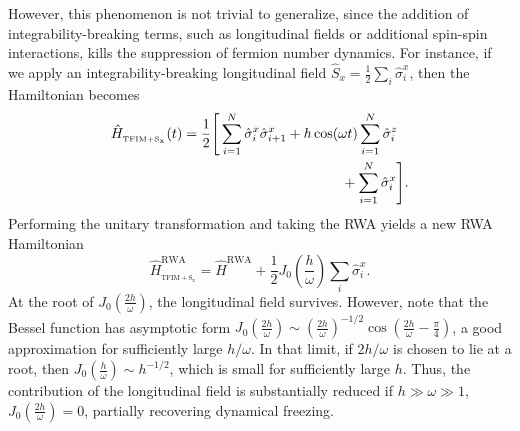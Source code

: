 \documentclass[%
reprint,
superscriptaddress,
amsmath,amssymb,
aps,
prb,
showkeys,
]{revtex4-2}
\begin{document}
However, this phenomenon is not trivial to generalize, since the addition of integrability-breaking terms, such as longitudinal fields or additional spin-spin interactions, kills the suppression of fermion number dynamics.  For instance, if we apply an integrability-breaking longitudinal field $\hat{S}_x = \frac12 \sum_i \hat{\sigma}^x_i$, then the Hamiltonian becomes 
\begin{align}
	\hat{H}_{_\mathrm{TFIM+S_{x}}}(t) &=\frac12 \Bigg[\sum^N_{i=1}  \hat{\sigma}_{i}^{x} \hat{\sigma}_{i+1}^{x}+h \cos (\omega t) \sum^N_{i=1} \hat{\sigma}_{i}^{z}\nonumber\\
	&\hskip4cm  +\sum^N_{i=1} \hat{\sigma}_{i}^{x}\Bigg].
	\label{eq:tfim_sx}
\end{align}	
Performing the unitary transformation and taking the RWA yields a new RWA Hamiltonian
\begin{equation}
	\hat{H}_{_\mathrm{TFIM+S_{x}}}^{\mathrm{RWA}}= \hat{H}^{\mathrm{RWA}}+\frac12 J_{0}\left(\frac{h}{\omega}\right) \sum_i\hat{\sigma}^x_i.
	\label{eq:tfim_sx1}
\end{equation}
At the root of $J_0\left(\frac{2h}{\omega}\right)$, the longitudinal field survives. However, note that the Bessel function has asymptotic form $J_0\left(\frac{2h}{\omega}\right)\sim \left(\frac{2h}{\omega}\right)^{-1/2}\cos\left(\frac{2h}{\omega}-\frac{\pi}{4}\right)$, a good approximation for sufficiently  large $h/\omega$. In that limit, if $2h/\omega$ is chosen to lie at a root, then $J_0\left(\frac{h}{\omega}\right) \sim h^{-1/2}$, which is small for sufficiently large $h$. Thus, the contribution of the longitudinal field is substantially reduced if $h\gg\omega\gg1$, $J_0\left(\frac{2h}{\omega}\right)=0$, partially recovering dynamical freezing.
\end{document}
